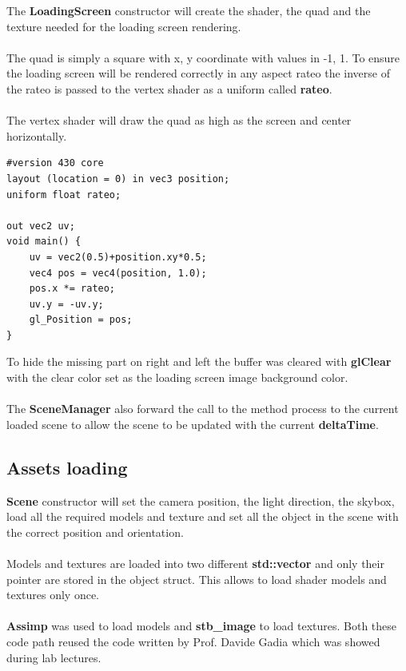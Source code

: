 \documentclass[12pt, a4paper]{article}
\begin{document}
The \textbf{LoadingScreen} constructor will create the shader, the quad and the texture needed for the loading screen
rendering.\\\\
The quad is simply a square with x, y coordinate with values in -1, 1. To ensure the loading screen will be rendered correctly
in any aspect rateo the inverse of the rateo is passed to the vertex shader as a uniform called \textbf{rateo}.\\\\
The vertex shader will draw the quad as high as the screen and center horizontally.
\begin{lstlisting}[caption={Loading screen vertex shader},captionpos=b]
#version 430 core
layout (location = 0) in vec3 position;
uniform float rateo;
    
out vec2 uv;
void main() {
    uv = vec2(0.5)+position.xy*0.5;
    vec4 pos = vec4(position, 1.0);
    pos.x *= rateo;
    uv.y = -uv.y;
    gl_Position = pos;
}
\end{lstlisting}
To hide the missing part on right and left
the buffer was cleared with \textbf{glClear} with the clear color set as the loading screen image background color.\\\\
The \textbf{SceneManager} also forward the call to the method process to the current loaded scene to allow the scene
to be updated with the current \textbf{deltaTime}.

\subsection{Assets loading}
\textbf{Scene} constructor will set the camera position, the light direction, the skybox, load all the required models and texture
and set all the object in the scene with the correct position and orientation.\\\\
Models and textures are loaded into two different \textbf{std::vector} and only their pointer are stored in the object struct.
This allows to load shader models and textures only once.\\\\
\textbf{Assimp} was used to load models and \textbf{stb\_image} to load textures. Both these code path
reused the code written by Prof. Davide Gadia which was showed during lab lectures.
\end{document}
